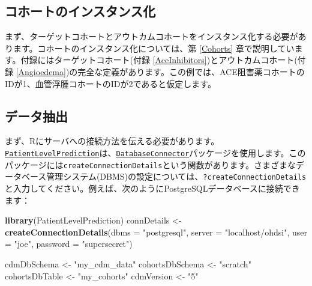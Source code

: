 \documentclass[
  11pt]{book}
\newenvironment{Shaded}{\begin{snugshade}}{\end{snugshade}}
\newcommand{\AttributeTok}[1]{\textcolor[rgb]{0.13,0.29,0.53}{#1}}
\newcommand{\FunctionTok}[1]{\textcolor[rgb]{0.13,0.29,0.53}{\textbf{#1}}}
\newcommand{\NormalTok}[1]{#1}
\newcommand{\OtherTok}[1]{\textcolor[rgb]{0.56,0.35,0.01}{#1}}
\newcommand{\StringTok}[1]{\textcolor[rgb]{0.31,0.60,0.02}{#1}}
\theoremstyle{definition}
\theoremstyle{definition}
\theoremstyle{definition}
\theoremstyle{definition}
\theoremstyle{remark}
\begin{document}
\subsection{コホートのインスタンス化}\label{ux30b3ux30dbux30fcux30c8ux306eux30a4ux30f3ux30b9ux30bfux30f3ux30b9ux5316-2}

まず、ターゲットコホートとアウトカムコホートをインスタンス化する必要があります。コホートのインスタンス化については、第 \ref{Cohorts} 章で説明しています。付録にはターゲットコホート(付録 \ref{AceInhibitors})とアウトカムコホート(付録 \ref{Angioedema})の完全な定義があります。この例では、ACE阻害薬コホートのIDが1、血管浮腫コホートのIDが2であると仮定します。

\subsection{データ抽出}\label{ux30c7ux30fcux30bfux62bdux51fa-3}

まず、Rにサーバへの接続方法を伝える必要があります。\href{https://ohdsi.github.io/PatientLevelPrediction/}{\texttt{PatientLevelPrediction}}は、\href{https://ohdsi.github.io/DatabaseConnector/}{\texttt{DatabaseConnector}}パッケージを使用します。このパッケージには\texttt{createConnectionDetails}という関数があります。さまざまなデータベース管理システム(DBMS)の設定については、\texttt{?createConnectionDetails}と入力してください。例えば、次のようにPostgreSQLデータベースに接続できます：

\begin{Shaded}
\begin{Highlighting}[]
\FunctionTok{library}\NormalTok{(PatientLevelPrediction)}
\NormalTok{connDetails }\OtherTok{\textless{}{-}} \FunctionTok{createConnectionDetails}\NormalTok{(}\AttributeTok{dbms =} \StringTok{"postgresql"}\NormalTok{,}
                                       \AttributeTok{server =} \StringTok{"localhost/ohdsi"}\NormalTok{,}
                                       \AttributeTok{user =} \StringTok{"joe"}\NormalTok{,}
                                       \AttributeTok{password =} \StringTok{"supersecret"}\NormalTok{)}

\NormalTok{cdmDbSchema }\OtherTok{\textless{}{-}} \StringTok{"my\_cdm\_data"}
\NormalTok{cohortsDbSchema }\OtherTok{\textless{}{-}} \StringTok{"scratch"}
\NormalTok{cohortsDbTable }\OtherTok{\textless{}{-}} \StringTok{"my\_cohorts"}
\NormalTok{cdmVersion }\OtherTok{\textless{}{-}} \StringTok{"5"}
\end{Highlighting}
\end{Shaded}
\end{document}
